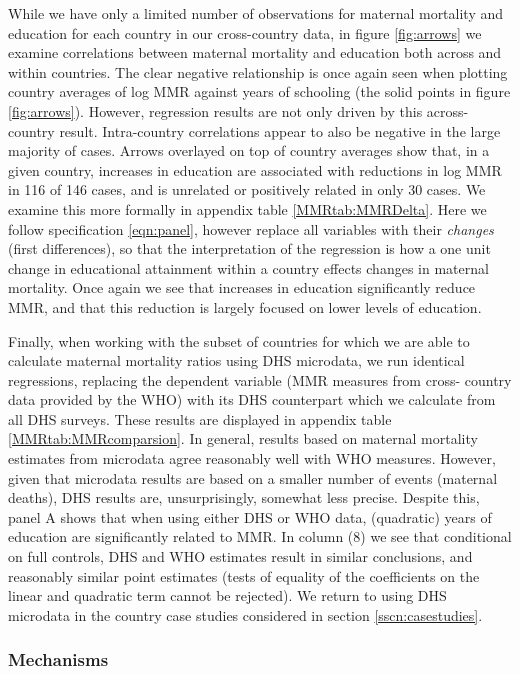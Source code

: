\documentclass{article}[12pt,subeqn]
\begin{document}
\begin{spacing}{1.4}
While we have only a limited number of observations for maternal
mortality and education for each country in our cross-country data, in figure
\ref{fig:arrows} we examine correlations between maternal mortality and 
education both across and within countries.  The clear negative relationship
is once again seen when plotting country averages of log MMR against years of
schooling (the solid points in figure \ref{fig:arrows}).  However, regression
results are not only driven by this across-country result.  Intra-country
correlations appear to also be negative in the large majority of cases. Arrows
overlayed on top of country averages show that, in a given country, increases
in education are associated with reductions in log MMR in 116 of 146 cases,
and is unrelated or positively related in only 30 cases.  We examine this
more formally in appendix table \ref{MMRtab:MMRDelta}.  Here we follow
specification \ref{eqn:panel}, however replace all variables with their
\emph{changes} (first differences), so that the interpretation of the regression
is how a one unit change in educational attainment within a country effects
changes in maternal mortality.  Once again we see that increases in education
significantly reduce MMR, and that this reduction is largely focused on
lower levels of education.

Finally, when working with the subset of countries for which we are able to
calculate maternal mortality ratios using DHS microdata, we run identical
regressions, replacing the dependent variable (MMR measures from cross-%
country data provided by the WHO) with its DHS counterpart which we 
calculate from all DHS surveys.  These results are displayed in appendix table 
\ref{MMRtab:MMRcomparsion}.  In general, results based on maternal mortality
estimates from microdata agree reasonably well with WHO measures.  However,
given that microdata results are based on a smaller number of events (maternal
deaths), DHS results are, unsurprisingly, somewhat less precise.  Despite this, 
panel A shows that when using either DHS or WHO data, (quadratic) years of 
education are 
significantly related to MMR.  In column (8) we see that conditional on full
controls, DHS and WHO estimates result in similar conclusions, and reasonably
similar point estimates (tests of equality of the coefficients on the linear
and quadratic term cannot be rejected).  We return to using DHS microdata
in the country case studies considered in section \ref{sscn:casestudies}.

\subsubsection{Mechanisms}

\end{spacing}
\end{document}
